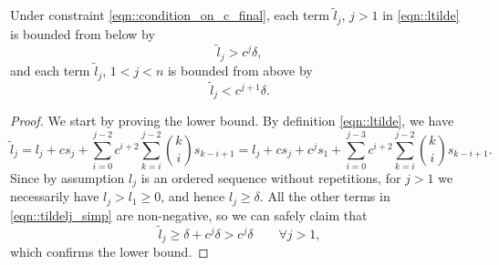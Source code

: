 \begin{lemma}
\label{thm::ltilde_bounds}
    Under constraint \cref{eqn::condition_on_c_final}, each term $\tilde{l}_j$, $j>1$ in \cref{eqn::ltilde} is bounded from below by
    $$\tilde{l}_j>c^j\delta,$$
    and each term $\tilde{l}_j$, $1<j<n$ is bounded from above by
    $$\tilde{l}_j<c^{j+1}\delta.$$
\end{lemma}
\begin{proof}
    We start by proving the lower bound. By definition \cref{eqn::ltilde}, we have
    \begin{equation}
        \tilde{l}_j = l_j+cs_j +\sum_{i=0}^{j-2}c^{i+2}\sum_{k=i}^{j-2}\binom{k}{i}s_{k-i+1} 
                    = l_j+cs_j +c^j s_{1} + \sum_{i=0}^{j-3}c^{i+2}\sum_{k=i}^{j-2}\binom{k}{i}s_{k-i+1}.
    \label{eqn::tildelj_simp}
    \end{equation}
    Since by assumption $l_j$ is an ordered sequence without repetitions, for $j>1$ we necessarily have $l_j>l_1\geq0$, and hence $l_j\geq\delta$. All the other terms in \cref{eqn::tildelj_simp} are non-negative, so we can safely claim that
    \begin{equation}
        \tilde{l}_j \geq \delta + c^j\delta > c^j\delta \qquad\forall j>1,
    \end{equation}
    which confirms the lower bound.
    

\end{proof}
